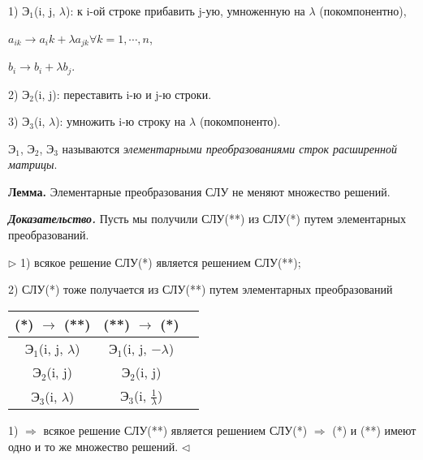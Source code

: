 \vspace{\baselineskip}
1) $Э_1$(i, j, $\lambda$): к i-ой строке прибавить j-ую, умноженную на $\lambda$ (покомпонентно),

$a_{ik} \rightarrow a_ik + \lambda a_{jk} \forall k = 1, \cdots, n$,

$b_i \rightarrow b_i + \lambda b_j$.

2) $Э_2$(i, j): переставить i-ю и j-ю строки.

3) $Э_3$(i, $\lambda$): умножить i-ю строку на $\lambda$ (покомпоненто).

\vspace{\baselineskip}
$Э_1$, $Э_2$, $Э_3$ называются \textit{элементарными преобразованиями строк расширенной матрицы}.

\vspace{\baselineskip}
\textbf{Лемма.} Элементарные преобразования СЛУ не меняют множество решений.

\vspace{\baselineskip}
\textbf{\textit{Доказательство.}} Пусть мы получили СЛУ(**) из СЛУ(*) путем элементарных преобразований.

$\rhd$ 1) всякое решение СЛУ(*) является решением СЛУ(**);

2) СЛУ(*) тоже получается из СЛУ(**) путем элементарных преобразований

\begin{table}[!ht]
	\begin{center}
		\begin{tabular}{c|c|c}
    	(*) $\rightarrow$ (**) & (**) $\rightarrow$ (*) \\
        \hline
        $Э_1$(i, j, $\lambda$) & $Э_1$(i, j, $-\lambda$)\\
        $Э_2$(i, j) & $Э_2$(i, j)\\
        $Э_3$(i, $\lambda$) & $Э_3$(i, $\frac{1}{\lambda}$)
		\end{tabular}
	\end{center}
\end{table}

\vspace{\baselineskip}
1) $\Rightarrow$ всякое решение СЛУ(**) является решением СЛУ(*) $\Rightarrow$ (*) и (**) имеют одно и то же множество решений. $\lhd$

